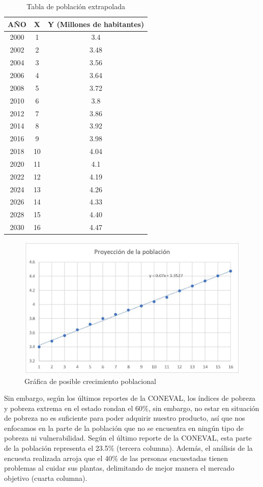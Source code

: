 \begin{table}[h]
\centering
\begin{tabular}{|c|c|c|}
\hline
\textbf{AÑO} & \textbf{X} & \textbf{Y (Millones de habitantes)} \\
\hline
2000 & 1 & 3.4 \\
2002 & 2 & 3.48 \\
2004 & 3 & 3.56 \\
2006 & 4 & 3.64 \\
2008 & 5 & 3.72 \\
2010 & 6 & 3.8 \\
2012 & 7 & 3.86 \\
2014 & 8 & 3.92 \\
2016 & 9 & 3.98 \\
2018 & 10 & 4.04 \\
2020 & 11 & 4.1 \\
2022 & 12 & 4.19 \\
2024 & 13 & 4.26 \\
2026 & 14 & 4.33 \\
2028 & 15 & 4.40 \\
2030 & 16 & 4.47 \\
\hline
\end{tabular}
\caption{Tabla de población extrapolada}
\label{tab:PoblacionExtrapolada}
\end{table}

\begin{figure}[H]
    \centering	
    \includegraphics[width=.8\textwidth]{img/Empresa/PosibleCrecimientoPoblacional.jpg} 
    \caption{Gráfica de posible crecimiento poblacional}
\label{fig:GraficaPoblacionOaxacaAprox}
\end{figure}

Sin embargo, según los últimos reportes de la CONEVAL, los índices de pobreza y pobreza extrema en el estado rondan el 60\%, sin embargo, no estar en situación de pobreza no es suficiente para poder adquirir nuestro producto, así que nos enfocamos en la parte de la población que no se encuentra en ningún tipo de pobreza ni vulnerabilidad. Según el último reporte de la CONEVAL, esta parte de la población representa el 23.5\% (tercera columna).
Además, el análisis de la encuesta realizada arroja que el 40\% de las personas encuestadas tienen problemas al cuidar sus plantas, delimitando de mejor manera el mercado objetivo (cuarta columna).

